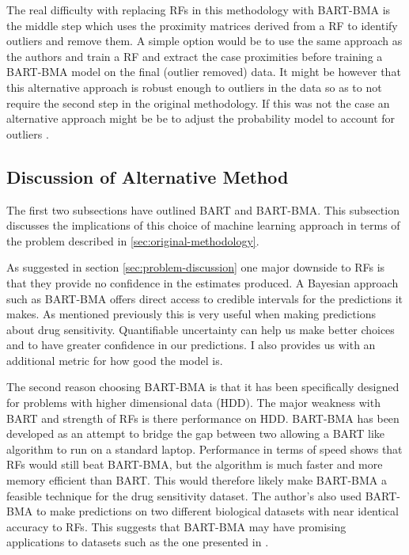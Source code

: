 \documentclass[journal]{IEEEtran}
\begin{document}
The real difficulty with replacing RFs in this methodology with BART-BMA is the middle step which uses the proximity matrices derived from a RF to identify outliers and remove them. A simple option would be to use the same approach as the authors and train a RF and extract the case proximities before training a BART-BMA model on the final (outlier removed) data. It might be however that this alternative approach is robust enough to outliers in the data so as to not require the second step in the original methodology. If this was not the case an alternative approach might be be to adjust the probability model to account for outliers \cite{chipmanPresentation}.

\subsection{Discussion of Alternative Method}
\label{subsec:discussion-alternate}
The first two subsections have outlined BART and BART-BMA. This subsection discusses the implications of this choice of machine learning approach in terms of the problem described in \ref{sec:original-methodology}. 

As suggested in section \ref{sec:problem-discussion} one major downside to RFs is that they provide no confidence in the estimates produced. A Bayesian approach such as BART-BMA offers direct access to credible intervals for the predictions it makes. As mentioned previously this is very useful when making predictions about drug sensitivity. Quantifiable uncertainty can help us make better choices and to have greater confidence in our predictions. I also provides us with an additional metric for how good the model is.

The second reason choosing BART-BMA is that it has been specifically designed for problems with higher dimensional data (HDD). The major weakness with BART and strength of RFs is there performance on HDD. BART-BMA has been developed as an attempt to bridge the gap between two allowing a BART like algorithm to run on a standard laptop. Performance in terms of speed shows that RFs would still beat BART-BMA, but the algorithm is much faster and more memory efficient than BART. This would therefore likely make BART-BMA a feasible technique for the drug sensitivity dataset. The author's also used BART-BMA to make predictions on two different biological datasets with near identical accuracy to RFs. This suggests that BART-BMA may have promising applications to datasets such as the one presented in \cite{riddick2011predicting}.
\end{document}
